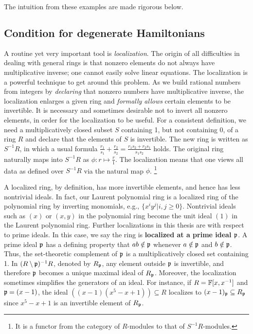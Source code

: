 The intuition from these examples are made rigorous below.

\subsection{Condition for degenerate Hamiltonians}

A routine yet very important tool is \emph{localization}.
The origin of all difficulties in dealing with general rings
is that nonzero elements do not always have multiplicative inverse;
one cannot easily solve linear equations.
The localization is a powerful technique to get around this problem.
As we build rational numbers from integers by \emph{declaring} that
nonzero numbers have multiplicative inverse,
the localization enlarges a given ring
and \emph{formally allows} certain elements to be invertible.
It is necessary and sometimes desirable not to invert all nonzero elements,
in order for the localization to be useful.
For a consistent definition, we need a multiplicatively closed subset $S$
containing 1, but not containing 0,
of a ring $R$ and declare that the elements of $S$ is invertible.
The new ring is written as $S^{-1}R$,
in which a usual formula $\frac{r_1}{s_1} + \frac{r_2}{s_2} = \frac{r_1 s_2 + r_2 s_1}{s_1 s_2}$ holds.
The original ring naturally maps into $S^{-1}R$ as $\phi : r \mapsto \frac{r}{1}$.
The localization means that one views all data as defined over $S^{-1}R$ via the natural map $\phi$.%
\footnote{It is a functor from the category of $R$-modules to that of $S^{-1}R$-modules.}

A localized ring, by definition, has more invertible elements, and hence has less nontrivial ideals.
In fact, our Laurent polynomial ring is a localized ring of the polynomial ring by inverting monomials,
e.g., $\{ x^i y^j | i,j \ge 0 \}$.
Nontrivial ideals such as $(x)$ or $(x,y)$ in the polynomial ring
become the unit ideal $(1)$ in the Laurent polynomial ring.
Further localizations in this thesis are with respect to prime ideals.
In this case, we say the ring is {\bf localized at a prime ideal $\mathfrak{p}$}.
A prime ideal $\mathfrak{p}$ has a defining property that
$a b \notin \mathfrak{p}$ whenever $a \notin \mathfrak{p}$ and $b \notin \mathfrak{p}$.
Thus, the set-theoretic complement of $\mathfrak{p}$ is a multiplicatively closed set containing 1.
In $(R\setminus \mathfrak{p})^{-1}R$, denoted by $R_{\mathfrak{p}}$, any element outside $\mathfrak{p}$ is invertible,
and therefore $\mathfrak{p}$ becomes a unique maximal ideal of $R_{\mathfrak{p}}$.
Moreover, the localization sometimes simplifies the generators of an ideal.
For instance, if $R=\mathbb{F}[x,x^{-1}]$ and $\mathfrak{p} = (x-1)$,
the ideal $((x -1)(x^5-x+1)) \subseteq R$ localizes to $(x-1)_{\mathfrak{p}} \subseteq R_{\mathfrak{p}}$
since $x^5-x+1$ is an invertible element of $R_{\mathfrak{p}}$.

